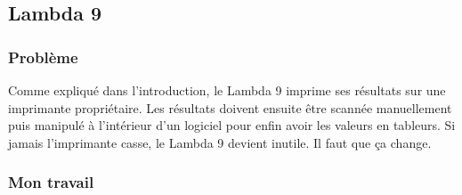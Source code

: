 \documentclass[12pt]{article}
\begin{document}
\newpage
\subsection{ Lambda 9 }

\subsubsection{ Problème }


Comme expliqué dans l'introduction, le Lambda 9 imprime ses résultats sur une imprimante propriétaire.
Les résultats doivent ensuite être scannée manuellement puis manipulé à l'intérieur d'un logiciel pour enfin avoir les valeurs en tableurs.
Si jamais l'imprimante casse, le Lambda 9 devient inutile.
Il faut que ça change.

\subsubsection{ Mon travail }
\end{document}
